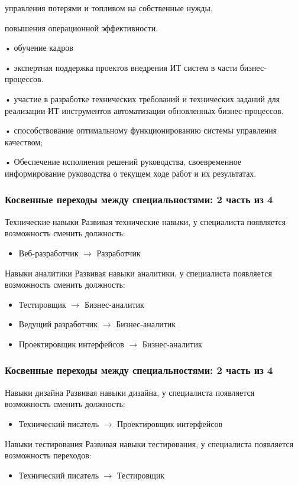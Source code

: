 \documentclass{../industrial-development}
\begin{document}
управления потерями и топливом на собственные нужды,

повышения операционной эффективности.

•       обучение кадров

•	экспертная поддержка проектов внедрения ИТ систем в части бизнес-процессов.

•	участие в разработке технических требований и технических заданий для реализации ИТ инструментов автоматизации обновленных бизнес-процессов.  

•	способствование оптимальному функционированию системы управления качеством;

•	Обеспечение исполнения решений руководства, своевременное информирование руководства о текущем ходе работ и их результатах.






\begin{frame} \frametitle{Косвенные переходы между специальностями: 2 часть из 4}
 \begin{block}{Технические навыки}
 Развивая \alert{технические навыки}, у специалиста появляется возможность сменить должность: 
\begin{itemize}
 \item Веб-разработчик $\rightarrow$ Разработчик
\end{itemize}
  \end{block}
  
\begin{block}{Навыки аналитики}
 Развивая \alert{навыки аналитики}, у специалиста появляется возможность сменить должность: 
\begin{itemize}
 \item Тестировщик $\rightarrow$ Бизнес-аналитик
 \item Ведущий разработчик $\rightarrow$ Бизнес-аналитик
 \item Проектировщик интерфейсов $\rightarrow$ Бизнес-аналитик
\end{itemize}
  \end{block}
\end{frame}


\begin{frame} \frametitle{Косвенные переходы между специальностями: 2 часть из 4}
 \begin{block}{Навыки дизайна}
 Развивая \alert{навыки дизайна}, у специалиста появляется возможность сменить должность: 
\begin{itemize}
 \item Технический писатель $\rightarrow$ Проектировщик интерфейсов
\end{itemize}
  \end{block}

\begin{block}{Навыки тестирования}
 Развивая \alert{навыки тестирования}, у специалиста появляется возможность переходов: 
\begin{itemize} 
 \item Технический писатель $\rightarrow$ Тестировщик
\end{itemize}
  \end{block}
\end{frame}
\end{document}

